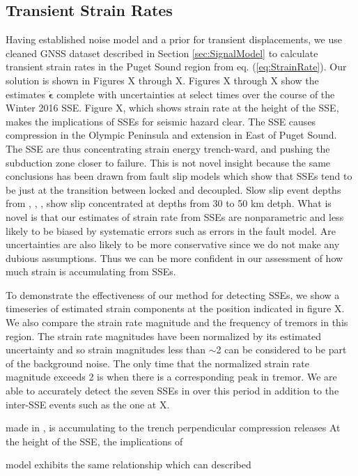 \documentclass[10pt,a4paper]{article}
\begin{document}
\subsection{Transient Strain Rates} 
Having established noise model and a prior for transient displacements, we use cleaned GNSS dataset described in Section \ref{sec:SignalModel} to calculate transient strain rates in the Puget Sound region from eq. (\ref{eq:StrainRate}). Our solution is shown in Figures X through X. Figures X through X show the estimates $\dot{\bm{\epsilon}}$ complete with uncertainties at select times over the course of the Winter 2016 SSE. Figure X, which shows strain rate at the height of the SSE, makes the implications of SSEs for seismic hazard clear.  The SSE causes compression in the Olympic Peninsula and extension in East of Puget Sound. The SSE are thus concentrating strain energy trench-ward, and pushing the subduction zone closer to failure. This is not novel insight because the same conclusions has been drawn from fault slip models which show that SSEs tend to be just at the transition between locked and decoupled. Slow slip event depths from \citet{Dragert2001}, \citet{Wech2009}, \citet{Schmidt2010}, \citet{Bartlow2011} show slip concentrated at depths from 30 to 50 km detph. What is novel is that our estimates of strain rate from SSEs are nonparametric and less likely to be biased by systematic errors such as errors in the fault model. Are uncertainties are also likely to be more conservative since we do not make any dubious assumptions. Thus we can be more confident in our assessment of how much strain is accumulating from SSEs.

To demonstrate the effectiveness of our method for detecting SSEs, we show a timeseries of estimated strain components at the position indicated in figure X.  We also compare the strain rate magnitude and the frequency of tremors in this region.  The strain rate magnitudes have been normalized by its estimated uncertainty and so strain magnitudes less than ${\sim}$2 can be considered to be part of the background noise. The only time that the normalized strain rate magnitude exceeds 2 is when there is a corresponding peak in tremor.  We are able to accurately detect the seven SSEs in over this period in addition to the inter-SSE events such as the one at X.      

made in ,  is accumulating to the trench perpendicular compression releases At the height of the SSE, the implications of    
  
model exhibits the same relationship  which can described  
\end{document}
